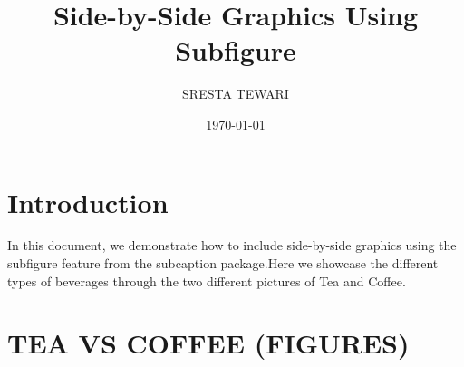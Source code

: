 \documentclass{article}
\begin{document}
\title{Side-by-Side Graphics Using Subfigure}
\author{SRESTA TEWARI}
\date{\today}
\maketitle

\section{Introduction}
In this document, we demonstrate how to include side-by-side graphics using the subfigure feature from the subcaption package.Here we showcase the different types of beverages through the two different pictures of Tea and Coffee.

\section{TEA VS COFFEE (FIGURES)}
\end{document}
